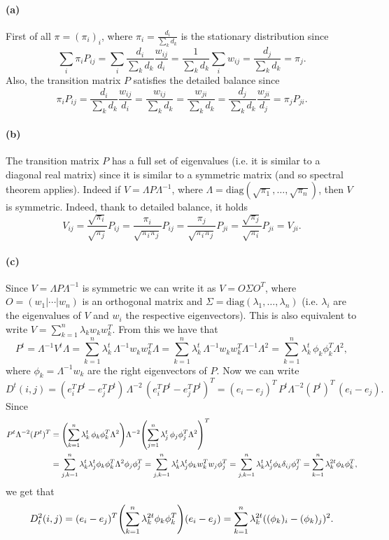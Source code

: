 \documentclass[a4paper,11pt]{article}
\theoremstyle{definition}
\theoremstyle{plain}
\theoremstyle{remark}
\DeclarePairedDelimiter{\parr}{(}{)}
\begin{document}
\paragraph*{(a)}

First of all $\pi=(\pi_i)_i$, where $\pi_i=\frac{d_i}{\sum_k d_k}$ is the stationary distribution since
$$
\sum_i \pi_iP_{ij} = \sum_i \frac{d_i}{\sum_k d_k}\frac{w_{ij}}{d_i} = \frac{1}{\sum_k d_k}\sum_i w_{ij} = \frac{d_j}{\sum_k d_k} = \pi_j.
$$
Also, the transition matrix $P$ satisfies the detailed balance since
$$
\pi_iP_{ij} = \frac{d_i}{\sum_k d_k}\frac{w_{ij}}{d_i} = \frac{w_{ij}}{\sum_k d_k} = \frac{w_{ji}}{\sum_k d_k} = \frac{d_j}{\sum_k d_k}\frac{w_{ji}}{d_j} =\pi_jP_{ji}.
$$

\paragraph*{(b)} 

The transition matrix $P$ has a full set of eigenvalues (i.e. it is similar to a diagonal real matrix) since it is similar to a symmetric matrix (and so spectral theorem applies). Indeed if $V=\Lambda P \Lambda^{-1}$, where $\Lambda = \mathrm{diag}(\sqrt{\pi_1},\dots,\sqrt{\pi_n})$, then $V$ is symmetric. Indeed, thank to detailed balance, it holds
$$
V_{ij} = \frac{\sqrt{\pi_i}}{\sqrt{\pi_j}}P_{ij} = \frac{\pi_i}{\sqrt{\pi_i\pi_j}}P_{ij} = \frac{\pi_j}{\sqrt{\pi_i\pi_j}}P_{ji} = \frac{\sqrt{\pi_j}}{\sqrt{\pi_i}}P_{ji} = V_{ji}.
$$ 

\paragraph*{(c)}

Since $V=\Lambda P \Lambda^{-1}$ is symmetric we can write it as $V = O\Sigma O^T$, where $O=(w_1|\cdots|w_n)$ is an orthogonal matrix and $\Sigma = \mathrm{diag}(\lambda_1,\dots,\lambda_n)$ (i.e. $\lambda_i$ are the eigenvalues of $V$ and $w_i$ the respective eigenvectors). This is also equivalent to write $V=\sum_{k=1}^n\lambda_kw_kw_k^T$. From this we have that
$$
P^t = \Lambda^{-1}V^t\Lambda = \sum_{k=1}^n\lambda_k^t\,\Lambda^{-1}w_kw_k^T\Lambda = \sum_{k=1}^n\lambda_k^t\,\Lambda^{-1}w_kw_k^T\Lambda^{-1}\Lambda^2 = \sum_{k=1}^n\lambda_k^t\,\phi_k\phi_k^T\Lambda^2,
$$
where $\phi_k=\Lambda^{-1}w_k$ are the right eigenvectors of $P$. Now we can write 
$$
D^t(i,j) = (e_i^TP^t-e_j^TP^t)\,\Lambda^{-2}\,(e_i^TP^t-e_j^TP^t)^T = (e_i-e_j)^T\,P^t\Lambda^{-2}(P^t)^T\,(e_i-e_j).
$$
Since
\begin{align*}
P^t\Lambda^{-2}(P^t)^T & = \parr*{\sum_{k=1}^n\lambda_k^t\,\phi_k\phi_k^T\Lambda^2}\Lambda^{-2}\parr*{\sum_{j=1}^n\lambda_j^t\,\phi_j\phi_j^T\Lambda^2}^T \\ & = \sum_{j,k = 1}^n \lambda_k^t\lambda_j^t\phi_k\phi_k^T\Lambda^2\phi_j\phi_j^T = \sum_{j,k = 1}^n \lambda_k^t\lambda_j^t\phi_kw_k^Tw_j\phi_j^T = \sum_{j,k = 1}^n \lambda_k^t\lambda_j^t\phi_k\delta_{ij}\phi_j^T = \sum_{k = 1}^n \lambda_k^{2t}\phi_k\phi_k^T,
\end{align*}
we get that
$$
D^2_t(i,j) = (e_i-e_j)^T\parr*{\sum_{k = 1}^n \lambda_k^{2t}\phi_k\phi_k^T}(e_i-e_j) = \sum_{k=1}^n\lambda_k^{2t}((\phi_k)_i-(\phi_k)_j)^2.
$$
\end{document}
